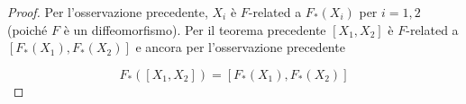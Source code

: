 \begin{proof}
	Per l'osservazione precedente, $ X_{i} $ è $ F $-related a $ F_{*}(X_{i}) $ per $ i=1,2 $ (poiché $ F $ è un diffeomorfismo). Per il teorema precedente $ [X_{1},X_{2}] $ è $ F $-related a $ [F_{*} (X_{1}),F_{*} (X_{2})] $ e ancora per l'osservazione precedente
	
	\begin{equation}
		F_{*} ([X_{1},X_{2}]) = [F_{*} (X_{1}),F_{*} (X_{2})]
	\end{equation}
\end{proof}
